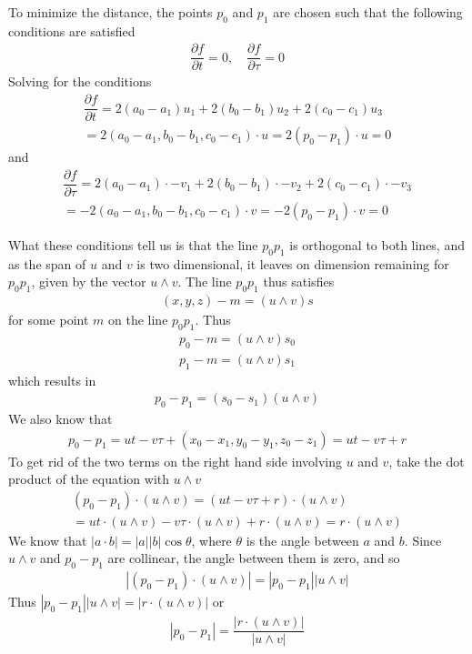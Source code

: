 \documentclass{article}
\begin{document}
	To minimize the distance, the points $p_0$ and $p_1$ are chosen such that the following conditions are satisfied
	\begin{gather*}
		\dfrac{\partial f}{\partial t} = 0, \quad \dfrac{\partial f}{\partial \tau} = 0
	\end{gather*}
	Solving for the conditions
	\begin{gather*}
		\dfrac{\partial f}{\partial t} = 2 (a_0 - a_1) u_1 + 2 (b_0 - b_1) u_2 + 2 (c_0 - c_1) u_3 \\
		= 2 (a_0 - a_1, b_0 - b_1, c_0 - c_1) \cdot u = 2 (p_0 - p_1) \cdot u = 0 
	\end{gather*}
	and
	\begin{gather*}
		\dfrac{\partial f}{\partial \tau} = 2 (a_0 - a_1) \cdot -v_1 + 2 (b_0 - b_1) \cdot -v_2 + 2 (c_0 - c_1) \cdot -v_3 \\
		= -2 (a_0 - a_1, b_0 - b_1, c_0 - c_1) \cdot v = -2 (p_0 - p_1) \cdot v = 0 
	\end{gather*}
	
	What these conditions tell us is that the line $p_0p_1$ is orthogonal to both lines, and as the span of $u$ and $v$ is two dimensional, it leaves on dimension remaining for $p_0p_1$, given by the vector $u \wedge v$. The line $p_0p_1$ thus satisfies
	\begin{gather*}
		(x, y, z) - m = (u \wedge v)s
	\end{gather*}
	for some point $m$ on the line $p_0p_1$. Thus
	\begin{gather*}
		p_0 - m = (u \wedge v)s_0 \\
		p_1 - m = (u \wedge v)s_1
	\end{gather*}
	which results in
	\begin{gather*}
		p_0 - p_1 = (s_0 - s_1) (u \wedge v)
	\end{gather*}
	We also know that
	\begin{gather*}
		p_0 - p_1 = ut - v\tau + (x_0 - x_1, y_0 - y_1, z_0 - z_1) = ut - v\tau + r
	\end{gather*}
	To get rid of the two terms on the right hand side involving $u$ and $v$, take the dot product of the equation with $u \wedge v$
	\begin{gather*}
		(p_0 - p_1) \cdot (u \wedge v) = (ut - v\tau + r) \cdot (u \wedge v) \\
		= ut \cdot (u \wedge v) - v\tau \cdot (u \wedge v) + r \cdot (u \wedge v) = r \cdot (u \wedge v)
	\end{gather*}
	We know that $|a \cdot b| = |a||b| \cos \theta$, where $\theta$ is the angle between $a$ and $b$. Since $u \wedge v$ and $p_0 - p_1$ are collinear, the angle between them is zero, and so
	\begin{gather*}
		|(p_0 - p_1) \cdot (u \wedge v)| = |p_0 - p_1| |u \wedge v|
	\end{gather*}
	Thus $|p_0 - p_1| |u \wedge v| = |r \cdot (u \wedge v)|$ or
	\begin{gather*}
		|p_0 - p_1| = \dfrac{|r \cdot (u \wedge v)|}{|u \wedge v|}
	\end{gather*}
	
\end{document}
